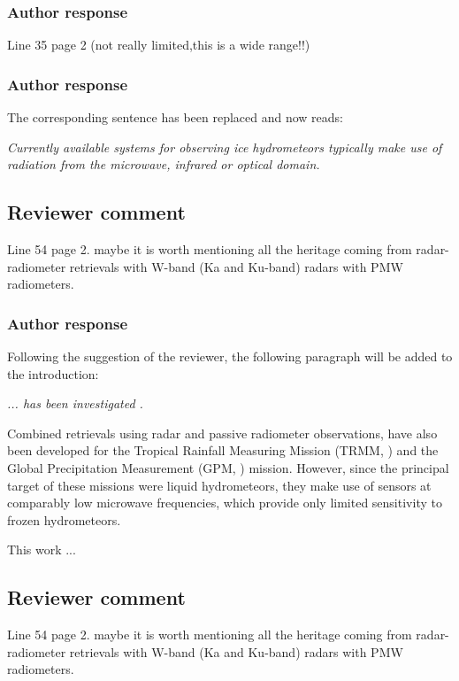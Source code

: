 \documentclass[11pt]{scrartcl}
\begin{document}
\subsubsection*{Author response}
Line 35 page 2 (not really limited,this is a wide range!!)

\subsubsection*{Author response}

The corresponding sentence has been replaced and now reads:

{\itshape Currently available systems for observing ice hydrometeors typically make use of
radiation from the microwave, infrared or optical domain.}

\subsection*{Reviewer comment}
Line 54 page 2.  maybe it is worth mentioning all the heritage coming from radar-radiometer retrievals with W-band (Ka and Ku-band) radars with PMW radiometers. 

\subsubsection*{Author response}
Following the suggestion of the reviewer, the following paragraph will be added to the introduction:

{\itshape 
... has been
investigated \citep{evans05, jiang19}.

Combined retrievals using radar and passive radiometer observations, have also
been developed for the Tropical Rainfall Measuring Mission (TRMM,
\citet{kummerow98, grecu04}) and the Global Precipitation Measurement (GPM,
\cite{hou14, grecu16, munchak11}) mission. However, since the principal target
of these missions were liquid hydrometeors, they make use of sensors at
comparably low microwave frequencies, which provide only limited sensitivity to
frozen hydrometeors.

This work ...
}

\subsection*{Reviewer comment}
Line 54 page 2.  maybe it is worth mentioning all the heritage coming from radar-radiometer retrievals with W-band (Ka and Ku-band) radars with PMW radiometers. 
\end{document}
